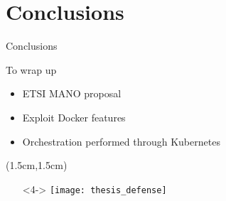 \section{Conclusions}
\begin{frame}{Conclusions}

  To wrap up
  \begin{itemize}
  \item<1-> ETSI MANO proposal
  \item<2-> Exploit Docker features
  \item<3-> Orchestration performed through Kubernetes
  \end{itemize}

  \begin{textblock*}{5cm}(1.5cm,1.5cm)
    \begin{itemize}
      \item[]<4-> \centering \texttt{[image: thesis\_defense]}
    \end{itemize}
  \end{textblock*}
\end{frame}
